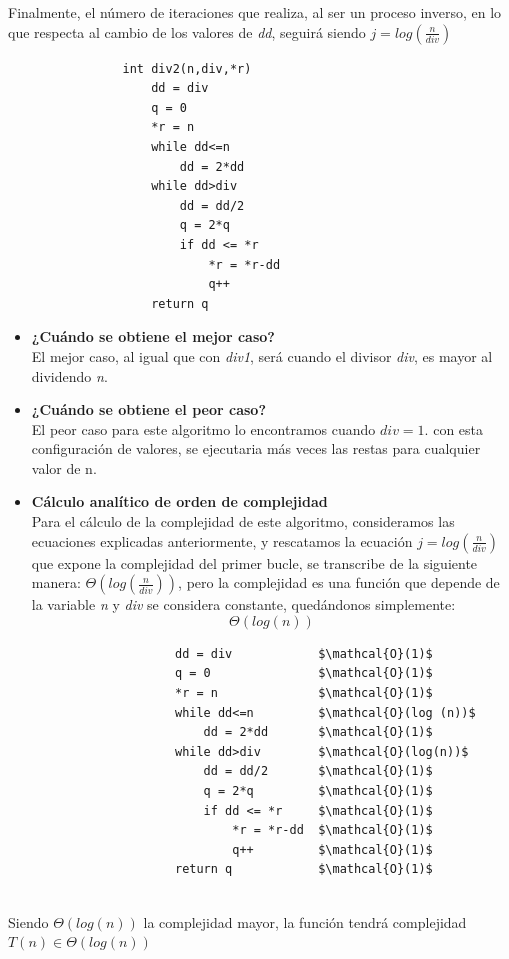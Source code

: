\documentclass{report}
\begin{document}
            Finalmente, el número de iteraciones que realiza, al ser un proceso inverso, en lo que respecta al cambio de los valores de \textit{dd}, seguirá siendo $j=log(\frac{n}{div})$
            \begin{verbatim}
                int div2(n,div,*r)
                    dd = div
                    q = 0
                    *r = n
                    while dd<=n
                        dd = 2*dd
                    while dd>div
                        dd = dd/2
                        q = 2*q
                        if dd <= *r
                            *r = *r-dd
                            q++
                    return q
            \end{verbatim}
            \begin{itemize}
                \item\textbf{¿Cu\'ando se obtiene el mejor caso?}\\
                El mejor caso, al igual que con \textit{div1}, será cuando el divisor \textit{div}, es mayor al dividendo \textit{n}.
                \item\textbf{¿Cu\'ando se obtiene el peor caso?}\\
                El peor caso para este algoritmo lo encontramos cuando $div=1$. con esta configuración de valores, se ejecutaria más veces las restas para cualquier valor de n.
                \item\textbf{C\'alculo anal\'itico de orden de complejidad}\\
                Para el cálculo de la complejidad de este algoritmo, consideramos las ecuaciones explicadas anteriormente, y rescatamos la ecuación $j = log(\frac{n}{div})$ que expone la complejidad del primer bucle, se transcribe de la siguiente manera: $\Theta(log(\frac{n}{div}))$, pero la complejidad es una función que depende de la variable \textit{n} y \textit{div} se considera constante, quedándonos simplemente: $$\Theta(log(n))$$
                \begin{lstlisting}
                    dd = div            $\mathcal{O}(1)$
                    q = 0               $\mathcal{O}(1)$
                    *r = n              $\mathcal{O}(1)$
                    while dd<=n         $\mathcal{O}(log (n))$
                        dd = 2*dd       $\mathcal{O}(1)$
                    while dd>div        $\mathcal{O}(log(n))$
                        dd = dd/2       $\mathcal{O}(1)$
                        q = 2*q         $\mathcal{O}(1)$
                        if dd <= *r     $\mathcal{O}(1)$
                            *r = *r-dd  $\mathcal{O}(1)$
                            q++         $\mathcal{O}(1)$
                    return q            $\mathcal{O}(1)$
                \end{lstlisting}
            \end{itemize}\\
            Siendo $\Theta(log(n))$ la complejidad mayor, la función tendrá complejidad $T(n) \in \Theta(log(n))$
        
\end{document}
